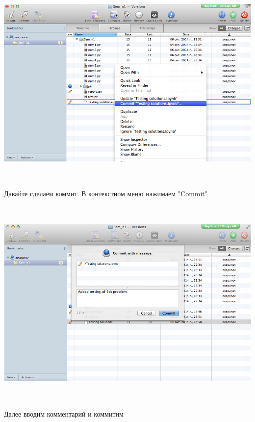 \documentclass[12pt, a4paper]{article}
\begin{document}
			\begin{center}
				\includegraphics[height=10.5cm]{svn/svn_12.png}

				Давайте сделаем коммит. В контекстном меню нажимаем "Commit" \\
			\end{center}

			\begin{center}
				\includegraphics[height=10.5cm]{svn/svn_13.png}

				Далее вводим комментарий и коммитим \\
				~\newline
			\end{center}
\end{document}

